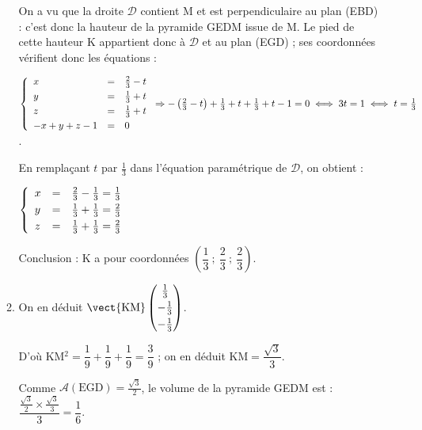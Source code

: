 \begin{enumerate}
\begin{enumerate}
On a vu que la droite $\mathcal{D}$ contient M et est perpendiculaire au plan (EBD) : c'est donc la hauteur de la pyramide GEDM issue de M. Le pied de cette hauteur K appartient donc à $\mathcal{D}$ et au plan (EGD) ; ses coordonnées vérifient donc les équations :

$\left\{\begin{array}{l c l}
x	&=&\frac{2}{3} - t\\[3pt]
y	&=&\frac{1}{3} + t\\[3pt]
z 	&=&\frac{1}{3} + t\\[3pt]
- x + y + z - 1&=&0
\end{array}\right.\Rightarrow -\left(\frac{2}{3} - t \right) + \frac{1}{3} + t + \frac{1}{3} + t - 1 = 0 \iff 3t = 1 \iff t = \frac{1}{3}$.

En remplaçant $t$ par $\frac{1}{3}$ dans l'équation paramétrique de $\mathcal{D}$, on obtient :

$\left\{\begin{array}{l c l}
x	&=&\frac{2}{3} - \frac{1}{3} = \frac{1}{3}\\[3pt]
y	&=&\frac{1}{3} + \frac{1}{3} = \frac{2}{3}\\[3pt]
z 	&=&\frac{1}{3} + \frac{1}{3} = \frac{2}{3}
\end{array}\right.$

Conclusion : K a pour coordonnées $\left(\dfrac{1}{3}~;~\dfrac{2}{3}~;~\dfrac{2}{3} \right)$.
		\item %
On en déduit $\vect{\text{KM}}\begin{pmatrix}\frac{1}{3}\\[3pt]- \frac{1}{3}\\[3pt]- \frac{1}{3}\end{pmatrix}$.

D'où KM$^2 = \dfrac{1}{9} + \dfrac{1}{9} + \dfrac{1}{9} = \dfrac{3}{9}$ ; on en déduit KM$ = \dfrac{\sqrt{3}}{3}$.
		
%
Comme $\mathcal{A}(\text{EGD}) = \frac{\sqrt{3}}{2}$, le volume de la pyramide GEDM est  : $\dfrac{\frac{\sqrt{3}}{2}\times \frac{\sqrt{3}}{3}}{3} = \dfrac{1}{6}$.
	\end{enumerate}
\end{enumerate}

\bigskip


